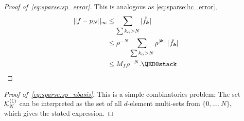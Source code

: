 \begin{proof}[Proof of~\ref{eq:sparse:sp_error}]
    This is analogous as  \eqref{eq:sparse:hc_error}, 
    \begin{align*}
        \|f - p_N\|_\infty 
        &\leq \sum_{\sum k_\alpha > N} |\tilde{f}_\bk| \\ 
        &\leq \rho^{-N} \sum_{\sum k_\alpha > N} \rho^{|\bk|_1} |\tilde{f}_\bk| \\ 
        &\leq M_f \rho^{-N}. \qedhere 
    \end{align*}
\end{proof}
\begin{proof}[Proof of~\eqref{eq:sparse:sp_nbasis}]
    This is a simple combinatorics problem: The set $\mathcal{K}_N^{(1)}$ can be 
    interpreted as the set of all $d$-element multi-sets from 
    $\{0, \dots, N\}$, which gives the stated expression. 
\end{proof}

